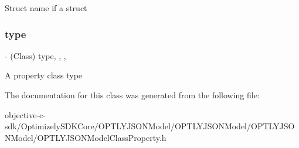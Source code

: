 Struct name if a struct \mbox{\label{interface_o_p_t_l_y_j_s_o_n_model_class_property_ad25d121fc33b337fc60f369dab9542ef}} 
\subsubsection{\texorpdfstring{type}{type}}
{\footnotesize\ttfamily -\/ (Class) type\hspace{0.3cm}{\ttfamily [read]}, {\ttfamily [write]}, {\ttfamily [nonatomic]}, {\ttfamily [assign]}}

A property class type 

The documentation for this class was generated from the following file\+:\begin{DoxyCompactItemize}
\item 
objective-\/c-\/sdk/\+Optimizely\+S\+D\+K\+Core/\+O\+P\+T\+L\+Y\+J\+S\+O\+N\+Model/\+O\+P\+T\+L\+Y\+J\+S\+O\+N\+Model/\+O\+P\+T\+L\+Y\+J\+S\+O\+N\+Model/O\+P\+T\+L\+Y\+J\+S\+O\+N\+Model\+Class\+Property.\+h\end{DoxyCompactItemize}
